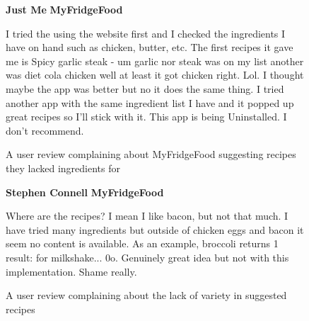 \newcommand{\review}[6]{
    \begin{figure}[H]
        \caption{#1}
        \label{#2}

        \textbf{#3} #4
        \hfill\textbf{#5}

        #6
    \end{figure}
}


\review
    {A user review complaining about MyFridgeFood suggesting recipes they lacked ingredients for}
    {fig:review_missing_ingredients}
    {Just Me}
    {\dingstarfull \dingstarempty \dingstarempty \dingstarempty \dingstarempty}
    {MyFridgeFood}
    {
        I tried the using the website first and I checked the ingredients I have on hand such as chicken,
        butter, etc. The first recipes it gave me is Spicy garlic steak - um garlic nor steak was on my list another was
        diet cola chicken well at least it got chicken right. Lol. I thought maybe the app was better but no it does the same thing.
        I tried another app with the same ingredient list I have and it popped up great recipes so I'll stick with it.
        This app is being Uninstalled. I don't recommend.
    }

\review
    {A user review complaining about the lack of variety in suggested recipes}
    {fig:review_lack_variety}
    {Stephen Connell}
    {\dingstarfull \dingstarfull \dingstarempty \dingstarempty \dingstarempty}
    {MyFridgeFood}
    {
        Where are the recipes? I mean I like bacon, but not that much. I have tried many ingredients
        but outside of chicken eggs and bacon it seem no content is available. As an example,
        broccoli returns 1 result: for milkshake... 0\textunderscore o. Genuinely great idea but not with this
        implementation. Shame really.
    }
